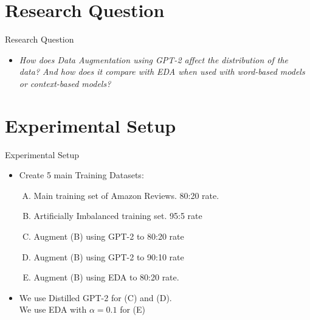 \documentclass{beamer}
\begin{document}
\section{Research Question}
\begin{frame}{Research Question}

\begin{itemize}
\item \textit{How does Data Augmentation using GPT-2 affect the distribution of the data? And how does it compare with EDA when used with word-based models or context-based models?} 
\end{itemize}

\end{frame}



\section{Experimental Setup}
\begin{frame}{Experimental Setup}

\begin{itemize}
\item<1-> Create 5 main Training Datasets:

\textbf{}
\begin{enumerate}[(A)]
    \item<1-> Main training set of Amazon Reviews. 80:20 rate. 
    
    \textbf{}
    \item<2-> Artificially Imbalanced training set. 95:5 rate
    
    \textbf{}
    \item<3-> Augment (B) using GPT-2 to 80:20 rate
    
    \textbf{}
    \item<4-> Augment (B) using GPT-2 to 90:10 rate
    
    \textbf{}
    \item<5-> Augment (B) using EDA to 80:20 rate.
\end{enumerate}

\textbf{}

\item<6-> We use Distilled GPT-2 for (C) and (D). \\ We use EDA with $\alpha = 0.1$ for (E)

\end{itemize}
\end{frame}
\end{document}
